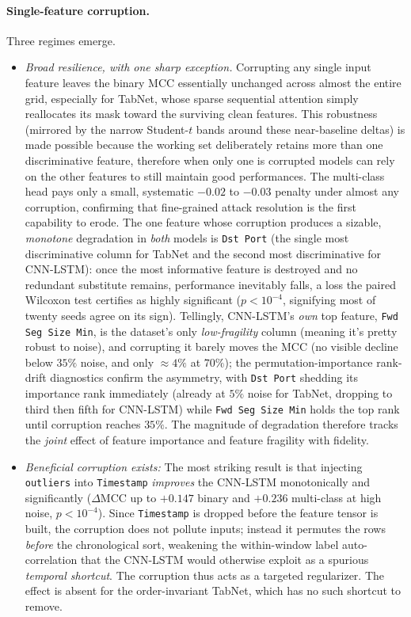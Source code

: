 \documentclass[a4paper, 9pt]{extarticle}
\begin{document}
\paragraph{Single-feature corruption.}
Three regimes emerge. 
\begin{itemize}
    \item \emph{Broad resilience, with one sharp exception.} Corrupting any single input feature leaves the binary MCC essentially unchanged across almost the entire grid, especially for TabNet, whose sparse sequential attention simply reallocates its mask toward the surviving clean features. This robustness (mirrored by the narrow Student-$t$ bands around these near-baseline deltas) is made possible because the working set deliberately retains more than one discriminative feature, therefore when only one is corrupted models can rely on the other features to still maintain good performances. The multi-class head pays only a small, systematic $-0.02$ to $-0.03$ penalty under almost any corruption, confirming that fine-grained attack resolution is the first capability to erode. The one feature whose corruption produces a sizable, \emph{monotone} degradation in \emph{both} models is \texttt{Dst Port} (the single most discriminative column for TabNet and the second most discriminative for CNN-LSTM): once the most informative feature is destroyed and no redundant substitute remains, performance inevitably falls, a loss the paired Wilcoxon test certifies as highly significant ($p<10^{-4}$, signifying most of twenty seeds agree on its sign). Tellingly, CNN-LSTM's \emph{own} top feature, \texttt{Fwd Seg Size Min}, is the dataset's only \emph{low-fragility} column (meaning it's pretty robust to noise), and corrupting it barely moves the MCC (no visible decline below $35\%$ noise, and only $\approx 4\%$ at $70\%$); the permutation-importance rank-drift diagnostics confirm the asymmetry, with \texttt{Dst Port} shedding its importance rank immediately (already at $5\%$ noise for TabNet, dropping to third then fifth for CNN-LSTM) while \texttt{Fwd Seg Size Min} holds the top rank until corruption reaches $35\%$. The magnitude of degradation therefore tracks the \emph{joint} effect of feature importance and feature fragility with fidelity.

    \item \emph{Beneficial corruption exists: } The most striking result is that injecting \texttt{outliers} into \texttt{Timestamp} \emph{improves} the CNN-LSTM monotonically and significantly ($\Delta\mathrm{MCC}$ up to $+0.147$ binary and $+0.236$ multi-class at high noise, $p<10^{-4}$). Since \texttt{Timestamp} is dropped before the feature tensor is built, the corruption does not pollute inputs; instead it permutes the rows \emph{before} the chronological sort, weakening the within-window label auto-correlation that the CNN-LSTM would otherwise exploit as a spurious \emph{temporal shortcut}. The corruption thus acts as a targeted regularizer. The effect is absent for the order-invariant TabNet, which has no such shortcut to remove.


\end{itemize}
\end{document}
